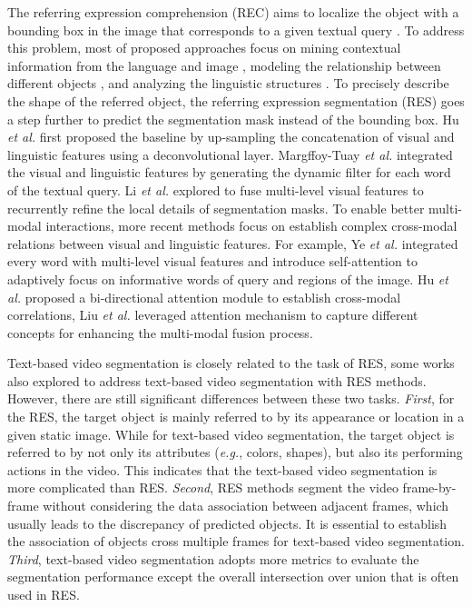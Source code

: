 \documentclass[journal]{IEEEtran}
\begin{document}
The referring expression comprehension (REC) aims to localize the object with a bounding box in the image that corresponds to a given textual query \cite{mao2016generation}. To address this problem, most of proposed approaches focus on mining contextual information from the language and image \cite{yu2016modeling, li2018bundled}, modeling the relationship between different objects \cite{wang2019neighbourhood, yang2019dynamic}, and analyzing the linguistic structures \cite{yu2018mattnet}. To precisely describe the shape of the referred object, the referring expression segmentation (RES) goes a step further to predict the segmentation mask instead of the bounding box. Hu \emph{et al.} first proposed the baseline by up-sampling the concatenation of visual and linguistic features using a deconvolutional layer. Margffoy-Tuay \emph{et al.} \cite{margffoy2018dynamic} integrated the visual and linguistic features by generating the dynamic filter for each word of the textual query. Li \emph{et al.} \cite{li2018referring} explored to fuse multi-level visual features to recurrently refine the local details of segmentation masks. To enable better multi-modal interactions, more recent methods \cite{shi2018key-word-aware,chen2019see-through-text,cmsa_pami,hu2020bi,liu2021cross,yang2021cmf} focus on establish complex cross-modal relations between visual and linguistic features. For example, Ye \emph{et al.} \cite{cmsa_pami} integrated every word with multi-level visual features and introduce self-attention to adaptively focus on informative words of query and regions of the image. Hu \emph{et al.} \cite{hu2020bi} proposed a bi-directional attention module to establish cross-modal correlations, Liu \emph{et al.} \cite{liu2021cross} leveraged attention mechanism to capture different concepts for enhancing the multi-modal fusion process.

Text-based video segmentation is closely related to the task of RES, some works \cite{cmsa_pami,liu2021cross} also explored to address text-based video segmentation with RES methods. However, there are still significant differences between these two tasks. \emph{First}, for the RES, the target object is mainly referred to by its appearance or location in a given static image. While for text-based video segmentation, the target object is referred to by not only its attributes (\emph{e.g.}, colors, shapes), but also its performing actions in the video. This indicates that the text-based video segmentation is more complicated than RES. \emph{Second}, RES methods segment the video frame-by-frame without considering the data association between adjacent frames, which usually leads to the discrepancy of predicted objects. It is essential to establish the association of objects cross multiple frames for text-based video segmentation. \emph{Third}, text-based video segmentation adopts more metrics to evaluate the segmentation performance except the overall intersection over union that is often used in RES.
\end{document}
